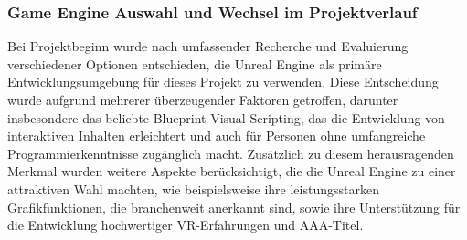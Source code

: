 \subsubsection{Game Engine Auswahl und Wechsel im Projektverlauf}
Bei Projektbeginn wurde nach umfassender Recherche und Evaluierung verschiedener Optionen entschieden, die Unreal Engine
als primäre Entwicklungsumgebung für dieses Projekt zu verwenden. Diese Entscheidung wurde aufgrund mehrerer überzeugender
Faktoren getroffen, darunter insbesondere das beliebte Blueprint Visual Scripting, das die Entwicklung von interaktiven
Inhalten erleichtert und auch für Personen ohne umfangreiche Programmierkenntnisse zugänglich macht. Zusätzlich zu diesem
herausragenden Merkmal wurden weitere Aspekte berücksichtigt, die die Unreal Engine zu einer attraktiven Wahl machten,
wie beispielsweise ihre leistungsstarken Grafikfunktionen, die branchenweit anerkannt sind, sowie ihre Unterstützung für
die Entwicklung hochwertiger VR-Erfahrungen und AAA-Titel.

